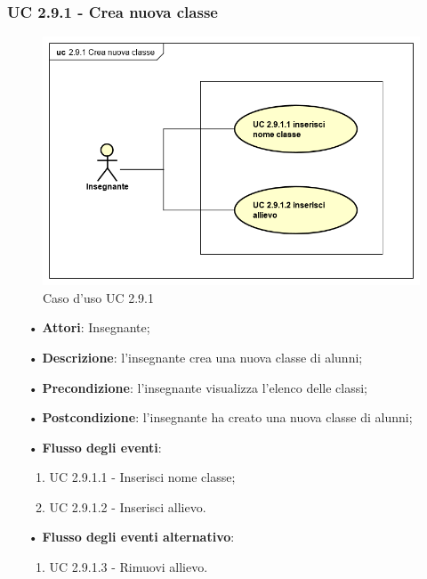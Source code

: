 \subsubsection{UC 2.9.1 - Crea nuova classe}
\begin{figure}[H]
	\centering
	\includegraphics[width=17cm]{img/Crea_nuova_classe.png} 
	\caption{Caso d'uso UC 2.9.1}
\end{figure}

\begin{itemize}
	\item[•] \textbf{Attori}: Insegnante;
	\item[•] \textbf{Descrizione}: l'insegnante crea una nuova classe di alunni;
	\item[•] \textbf{Precondizione}: l'insegnante visualizza l'elenco delle classi;
	\item[•] \textbf{Postcondizione}: l'insegnante ha creato una nuova classe di alunni;
	\item[•] \textbf{Flusso degli eventi}:
	\begin{enumerate}
		\item UC 2.9.1.1 - Inserisci nome classe;
		\item UC 2.9.1.2 - Inserisci allievo.
	\end{enumerate}
	\item[•] \textbf{Flusso degli eventi alternativo}:
	\begin{enumerate}
		\item UC 2.9.1.3 - Rimuovi allievo.
	\end{enumerate}
\end{itemize}

